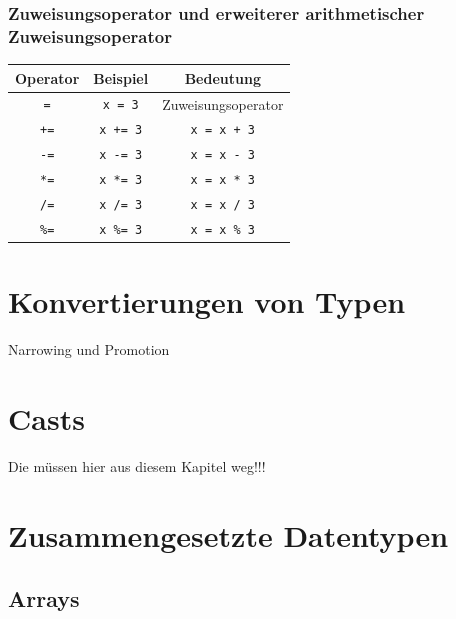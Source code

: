 \documentclass[a4paper]{report}
\begin{document}
\subsubsection{Zuweisungsoperator und erweiterer arithmetischer Zuweisungsoperator}
\begin{center}
	\begin{tabular}{|c|c|c|} \hline
		\textbf{Operator} &	\textbf{Beispiel} & \textbf{Bedeutung} \\ \hline
		\texttt{=} & \texttt{x = 3} & Zuweisungsoperator \\ \hline
		\texttt{+=} & \texttt{x += 3} & \texttt{x = x + 3} \\ \hline
		\texttt{-=} & \texttt{x -= 3} & \texttt{x = x - 3} \\ \hline
		\texttt{*=} & \texttt{x *= 3} & \texttt{x = x * 3} \\ \hline
		\texttt{/=} & \texttt{x /= 3} & \texttt{x = x / 3} \\ \hline
		\texttt{\%=} & \texttt{x \%= 3} & \texttt{x = x \% 3} \\ \hline	

	\end{tabular}
\end{center}




\section{Konvertierungen von Typen}
Narrowing und Promotion

\section{Casts}
	Die müssen hier aus diesem Kapitel weg!!!
\section{Zusammengesetzte Datentypen}
\subsection{Arrays}
\end{document}
